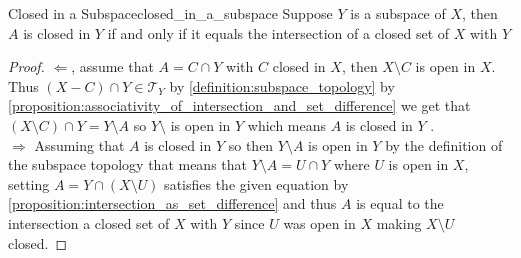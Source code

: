 \begin{proposition}{Closed in a Subspace}{closed_in_a_subspace}
Suppose \( Y \) is a subspace of \( X \), then \( A \) is closed in \( Y \) if
and only if it equals the intersection of a closed set of \( X \) with \( Y \) 
\end{proposition}
\begin{proof}
    \( \Leftarrow  \), assume that \( A =  C \cap  Y \) with \( C \) closed in
    \( X \), then \( X \setminus C \) is open in \( X \). Thus \( \left( X - C
    \right) \cap Y \in \mathcal{ T } _{ Y }   \) by
    \ref{definition:subspace_topology} by
    \ref{proposition:associativity_of_intersection_and_set_difference} we get
    that \( \left( X \setminus C \right) \cap  Y = Y \setminus A \) so \( Y
    \setminus  \) is open in \( Y \) which means \( A \) is closed in \( Y \)
    .\\
    \( \Rightarrow  \)  Assuming that \( A \) is closed in \( Y \) so then \( Y
    \setminus A\) is open in \( Y \) by the definition of the subspace topology
    that means that \( Y \setminus A = U \cap Y \) where \( U  \) is open in \(
    X\), setting \( A =  Y \cap  \left( X \setminus U \right)  \) satisfies the
    given equation by \ref{proposition:intersection_as_set_difference} and thus
    \( A \) is equal to the intersection a closed set of \( X \) with \( Y \)
    since \( U  \) was open in \( X \) making \( X \setminus U \) closed.
\end{proof}
